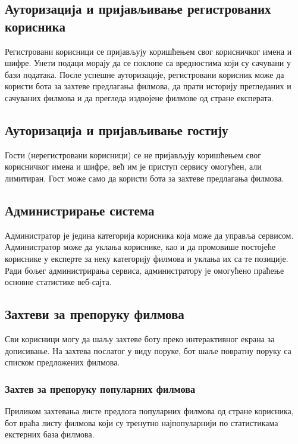 \subsection{Ауторизација и пријављивање регистрованих корисника}

Регистровани корисници се пријављују коришћењем свог корисничког имена и шифре. Унети подаци морају да се
поклопе са вредностима који су сачувани у бази података. После успешне ауторизације, регистровани корисник
може да користи бота за захтеве предлагања филмова, да прати историју прегледаних и сачуваних филмова и
да прегледа издвојене филмове од стране експерата.

\subsection{Ауторизација и пријављивање гостију}

Гости (нерегистровани корисници) се не пријављују коришћењем свог корисничког имена и шифре, већ им је приступ
сервису омогућен, али лимитиран. Гост може само да користи бота за захтеве предлагања филмова.

\subsection{Администрирање система}

Администратор је једина категорија корисника која може да управља сервисом. Администратор може да уклања
кориснике, као и да промовише постојеће кориснике у експерте за неку категорију филмова и уклања их са те
позиције. Ради бољег администрирања сервиса, администратору је омогућено праћење основне статистике веб-сајта.

\subsection{Захтеви за препоруку филмова}

Сви корисници могу да шаљу захтеве боту преко интерактивног екрана за дописивање. На захтева послатог у виду
поруке, бот шаље повратну поруку са списком предложених филмова.

\subsubsection{Захтев за препоруку популарних филмова}

Приликом захтевања листе предлога популарних филмова од стране корисника, бот враћа листу филмова који су
тренутно најпопуларнији по статистикама екстерних база филмова.

